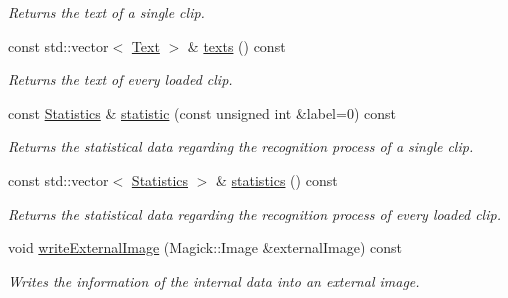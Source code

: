 \begin{CompactItemize}
\begin{CompactList}\small\item\em Returns the text of a single clip. \item\end{CompactList}\item 
const std::vector$<$ \hyperlink{class_text}{Text} $>$ \& \hyperlink{class_recognizer_2a365c34f1447cdc3311d311e02bf2ed}{texts} () const 
\begin{CompactList}\small\item\em Returns the text of every loaded clip. \item\end{CompactList}\item 
const \hyperlink{class_statistics}{Statistics} \& \hyperlink{class_recognizer_b941b1ad42c3bacb3c829acf7fc689de}{statistic} (const unsigned int \&label=0) const 
\begin{CompactList}\small\item\em Returns the statistical data regarding the recognition process of a single clip. \item\end{CompactList}\item 
const std::vector$<$ \hyperlink{class_statistics}{Statistics} $>$ \& \hyperlink{class_recognizer_8b38356d2741969e67cd6b4f507897ba}{statistics} () const 
\begin{CompactList}\small\item\em Returns the statistical data regarding the recognition process of every loaded clip. \item\end{CompactList}\item 
void \hyperlink{class_recognizer_559f62a3e3e2d0b799bab38e975b4b67}{writeExternalImage} (Magick::Image \&externalImage) const 
\begin{CompactList}\small\item\em Writes the information of the internal data into an external image. \item\end{CompactList}\end{CompactItemize}
